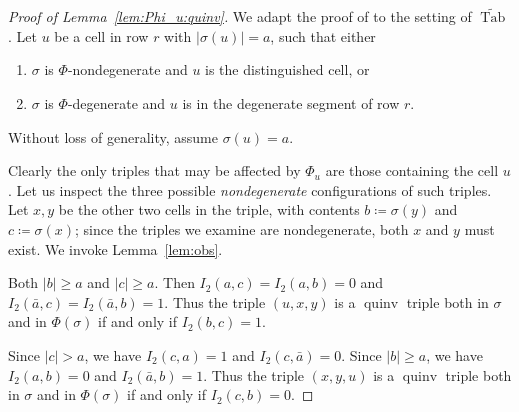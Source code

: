 \documentclass[11pt]{article}
\theoremstyle{definition}
\numberwithin{equation}{section}
\DeclareMathOperator{\PQT}{Tab}
\DeclareMathOperator{\quinv}{quinv}
\newcommand\cellL[4]{
\def\i{#1} \def\j{#2} \def\entry{#3} \def\labl{#4}
\draw (\j-1,-\i)--(\j,-\i)--(\j,-\i+1)--(\j-1,-\i+1)--(\j-1,-\i);
\node at (\j-.5,-\i+.5) {\entry};
\node at (\j-1.3,-\i+.8) {\tiny\labl};
}
\begin{document}
\begin{proof}[Proof of Lemma~\ref{lem:Phi_u:quinv}]
We adapt the proof of \cite[Lemma 5.2]{HHL05} to the setting of $\widetilde{\PQT}$.  Let $u$ be a cell in row $r$ with $|\sigma(u)|=a$, such that either
\begin{enumerate}
\item $\sigma$ is $\Phi$-nondegenerate and $u$ is the distinguished cell, or
\item $\sigma$ is $\Phi$-degenerate and $u$ is in the degenerate segment of row $r$. 
\end{enumerate}
Without loss of generality, assume $\sigma(u)=a$. 

Clearly the only triples that may be affected by $\Phi_u$ are those containing the cell $u$. Let us inspect the three possible \emph{nondegenerate} configurations of such triples. Let $x,y$ be the other two cells in the triple, with contents $b\coloneqq\sigma(y)$ and $c\coloneqq\sigma(x)$; since the triples we examine are nondegenerate, both $x$ and $y$ must exist. We invoke Lemma~\ref{lem:obs}.
\begin{flushleft}
\end{flushleft}
Both $|b|\geq a$ and $|c|\geq a$. Then $I_2(a,c)=I_2(a,b)=0$ and $I_2(\bar{a},c)=I_2(\bar{a},b)=1$. Thus the triple $(u,x,y)$ is a $\quinv$ triple both in $\sigma$ and in $\Phi(\sigma)$ if and only if $I_2(b,c)=1$.
\begin{flushleft}
\end{flushleft}
Since $|c|>a$, we have $I_2(c,a)=1$ and $I_2(c,\bar{a})=0$. Since $|b|\geq a$, we have $I_2(a,b)=0$ and $I_2(\bar{a},b)=1$. Thus the triple $(x,y,u)$ is a $\quinv$ triple both in $\sigma$ and in $\Phi(\sigma)$ if and only if $I_2(c,b)=0$.

\end{proof}
\end{document}
